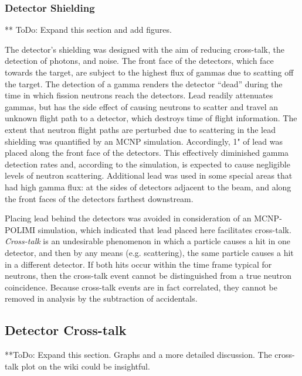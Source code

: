 \subsubsection{Detector Shielding}
** ToDo: Expand this section and add figures. 

The detector's shielding was designed with the aim of reducing cross-talk, the detection of photons, and noise. 
The front face of the detectors, which face towards the target, are subject to the highest flux of gammas due to scatting off the target. The detection of a gamma renders the detector ``dead'' during the time in which fission neutrons reach the detectors. Lead readily attenuates gammas, but has the side effect of causing neutrons to scatter and travel an unknown flight path to a detector, which destroys time of flight information. The extent that neutron flight paths are perturbed due to scattering in the lead shielding was quantified by an MCNP simulation. Accordingly, 1" of lead was placed along the front face of the detectors. This effectively diminished gamma detection rates and, according to the simulation, is expected to cause negligible levels of neutron scattering. Additional lead was used in some special areas that had high gamma flux: at the sides of detectors adjacent to the beam, and along the front faces of the detectors farthest downstream. 

Placing lead behind the detectors was avoided in consideration of an MCNP-POLIMI simulation, which indicated that lead placed here facilitates cross-talk. \textit{Cross-talk} is an undesirable phenomenon in which a particle causes a hit in one detector, and then by any means (e.g. scattering), the same particle causes a hit in a different detector. If both hits occur within the time frame typical for neutrons, then the cross-talk event cannot be distinguished from a true neutron coincidence. Because cross-talk events are in fact correlated, they cannot be removed in analysis by the subtraction of accidentals. 

\subsection{Detector Cross-talk}
**ToDo: Expand this section. Graphs and a more detailed discussion. The cross-talk plot on the wiki could be insightful. 


